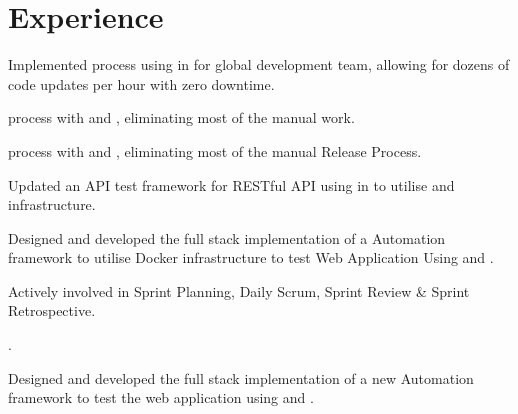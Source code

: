 \documentclass[]{openfont}
\begin{document}
\begin{minipage}[t]{0.66\textwidth} 


\section{Experience}

\vspace{\topsep} %
\begin{tightemize}
\item Implemented  process using  in  for global development team, allowing for dozens of code updates per hour with zero downtime.
\item {} process with  and , eliminating most of the manual work.
\item {} process with  and , eliminating most of the manual Release Process.
\item Updated an API test framework for RESTful API using  in  to utilise  and  infrastructure.
\item Designed and developed the full stack implementation of a Automation framework to utilise Docker infrastructure to test Web Application Using  and .
\item Actively involved in Sprint Planning, Daily Scrum, Sprint Review \& Sprint Retrospective.
\item {}.
\end{tightemize}
\sectionsep

\begin{tightemize}
\item Designed and developed the full stack implementation of a new Automation framework to test the web application using  and .
\end{tightemize}
\sectionsep


\end{minipage}
\end{document}
